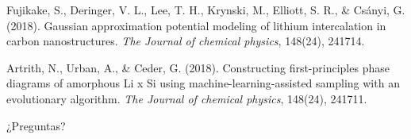 \documentclass[aspectratio=169]{beamer}
\begin{document}
\begin{frame}
{            Fujikake, S., Deringer, V. L., Lee, T. H., Krynski, M., 
                Elliott, S. R., \& Csányi, G. (2018). Gaussian approximation 
                potential modeling of lithium intercalation in carbon 
                nanostructures. \textit{The Journal of chemical physics}, 148(24), 241714.

            Artrith, N., Urban, A., \& Ceder, G. (2018). Constructing 
                first-principles phase diagrams of amorphous Li x Si using 
                machine-learning-assisted sampling with an evolutionary algorithm. 
                \textit{The Journal of chemical physics}, 148(24), 241711.
        }

    \end{frame}
    
    
    \begin{frame}
        \begin{center}
            \huge{¿Preguntas?}
        \end{center}
    \end{frame}
\end{document}
